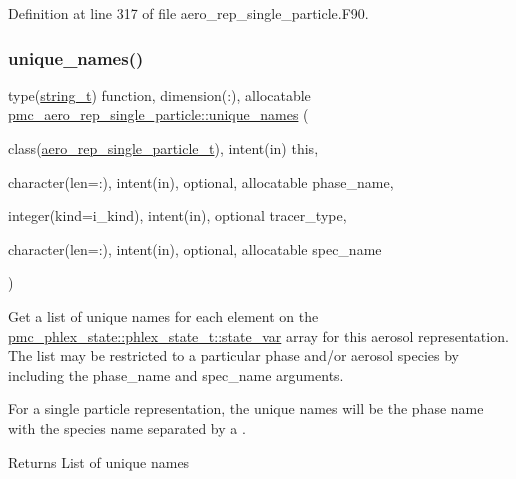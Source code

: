 Definition at line 317 of file aero\+\_\+rep\+\_\+single\+\_\+particle.\+F90.

\mbox{\label{namespacepmc__aero__rep__single__particle_a1098b3373c2ff364ed4ff94ae7c92e87}} 
\subsubsection{\texorpdfstring{unique\+\_\+names()}{unique\_names()}}
{\footnotesize\ttfamily type(\mbox{\hyperlink{structpmc__util_1_1string__t}{string\+\_\+t}}) function, dimension(\+:), allocatable \mbox{\hyperlink{interfacepmc__aero__rep__data_1_1unique__names}{pmc\+\_\+aero\+\_\+rep\+\_\+single\+\_\+particle\+::unique\+\_\+names}} (\begin{DoxyParamCaption}\item[{class(\mbox{\hyperlink{structpmc__aero__rep__single__particle_1_1aero__rep__single__particle__t}{aero\+\_\+rep\+\_\+single\+\_\+particle\+\_\+t}}), intent(in)}]{this,  }\item[{character(len=\+:), intent(in), optional, allocatable}]{phase\+\_\+name,  }\item[{integer(kind=i\+\_\+kind), intent(in), optional}]{tracer\+\_\+type,  }\item[{character(len=\+:), intent(in), optional, allocatable}]{spec\+\_\+name }\end{DoxyParamCaption})\hspace{0.3cm}{\ttfamily [private]}}



Get a list of unique names for each element on the {\ttfamily \mbox{\hyperlink{structpmc__phlex__state_1_1phlex__state__t_a78835cb552d483ebbfc7a6bc6f756918}{pmc\+\_\+phlex\+\_\+state\+::phlex\+\_\+state\+\_\+t\+::state\+\_\+var}}} array for this aerosol representation. The list may be restricted to a particular phase and/or aerosol species by including the phase\+\_\+name and spec\+\_\+name arguments. 

For a single particle representation, the unique names will be the phase name with the species name separated by a \textquotesingle{}.\textquotesingle{}

\begin{DoxyReturn}{Returns}
List of unique names
\end{DoxyReturn}

